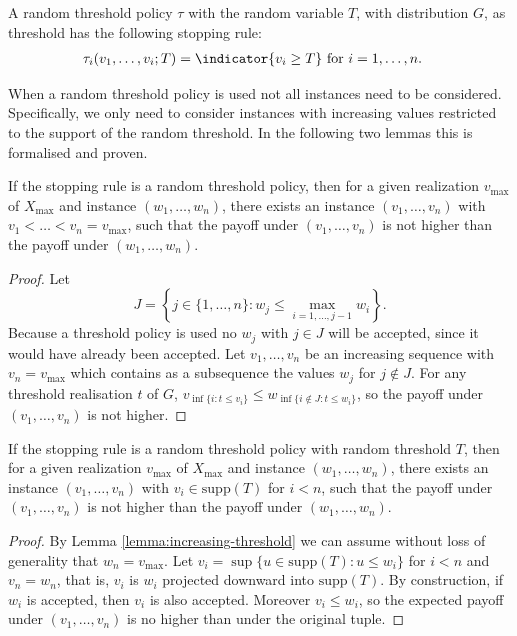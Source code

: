 \documentclass[11pt,a4paper]{article}
\numberwithin{equation}{section}
\begin{document}
\begin{definition}
    \label{def:RTP}
    A random threshold policy $\tau$ with the random variable $T$, with distribution $G$, as threshold has the following stopping rule:
    \begin{align*}
        \tau_i(v_1,\dots,v_i;T)&=\indicator{v_i\ge T}\text{ for }i=1,\dots,n.
    \end{align*}
\end{definition}

When a random threshold policy is used not all instances need to be considered.
Specifically, we only need to consider instances with increasing values restricted to the support of the random threshold.
In the following two lemmas this is formalised and proven.  
\begin{lemma}
    \label{lemma:increasing-threshold}
    If the stopping rule is a random threshold policy, then for a given realization $v_{\max}$ of $X_{\max}$ and instance $(w_1,\dots,w_n)$, there exists an instance $(v_1,\dots,v_n)$ with $v_1< \dots< v_n=v_{\max}$, such that the payoff under $(v_1,\dots,v_n)$ is not higher than the payoff under $(w_1,\dots,w_n)$.
\end{lemma}
\begin{proof}
    Let 
    $$
    J=\left\{j\in\{1,\dots,n\}:w_j\le \max_{i=1,\dots,j-1} w_i \right\}.
    $$
    Because a threshold policy is used no $w_j$ with $j\in J$ will be accepted, since it would have already been accepted. Let $v_1,\dots,v_n$ be an increasing sequence with $v_n=v_{\max}$ which contains as a subsequence the values $w_j$ for $j\notin J$. 
    For any threshold realisation $t$ of $G$, $v_{\inf\{i:t\le v_i\}}\le w_{\inf\{i\notin J:t\le w_i\}}$, so the payoff under $(v_1,\dots,v_n)$ is not higher. 
\end{proof}

\begin{lemma}
    \label{lemma:support-restriction}
    If the stopping rule is a random threshold policy with random threshold $T$, then for a given realization $v_{\max}$ of $X_{\max}$ and instance $(w_1,\dots,w_n)$, there exists an instance $(v_1,\dots,v_n)$ with $v_i\in\mathrm{supp}(T)$ for $i<n$, such that the payoff under $(v_1,\dots,v_n)$ is not higher than the payoff under $(w_1,\dots,w_n)$. 
\end{lemma}
\begin{proof}
    By Lemma \ref{lemma:increasing-threshold} we can assume without loss of generality that $w_n=v_{\max}$. 
    Let $v_i=\sup\{u\in\mathrm{supp}(T):u\le w_i\}$ for $i<n$ and $v_n=w_n$, that is, $v_i$ is $w_i$ projected downward into $\mathrm{supp}(T)$. By construction, if $w_i$ is accepted, then $v_i$ is also accepted. Moreover $v_i\le w_i$, so the expected payoff under $(v_1,\dots,v_n)$
    is no higher than under the original tuple. 
\end{proof}
\end{document}
